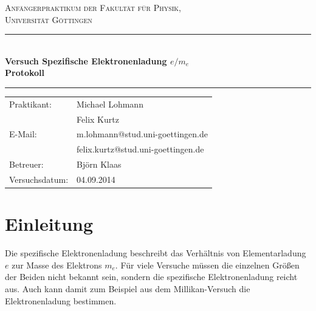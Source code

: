 \documentclass[12pt,a4paper,titlepage,headinclude,bibtotoc]{scrartcl}
\numberwithin{equation}{section}
\begin{document}
\newpage
\begin{titlepage}
\centering
\textsc{\Large Anfängerpraktikum der Fakultät für
  Physik,\\[1.5ex] Universität Göttingen}

\vspace*{3cm}

\rule{\textwidth}{1pt}\\[0.5cm]
{\huge \bfseries
  Versuch Spezifische Elektronenladung $e/m_e$\\[1.5ex]
  Protokoll}\\[0.5cm]
\rule{\textwidth}{1pt}

\vspace*{3cm}

\begin{Large}
\begin{tabular}{ll}
Praktikant: &  Michael Lohmann\\
 &  Felix Kurtz\\
 E-Mail: & m.lohmann@stud.uni-goettingen.de\\
 &  felix.kurtz@stud.uni-goettingen.de\\
 Betreuer: & Björn Klaas\\
 Versuchsdatum: & 04.09.2014\\
\end{tabular}
\end{Large}

\vspace*{0.8cm}

\begin{Large}
\end{Large}

\end{titlepage}

\tableofcontents

\newpage

\section{Einleitung}
\label{sec:einleitung}
Die spezifische Elektronenladung beschreibt das Verhältnis von Elementarladung $e$ zur Masse des Elektrons $m_e$.
Für viele Versuche müssen die einzelnen Größen der Beiden nicht bekannt sein, sondern die spezifische Elektronenladung reicht aus.
Auch kann damit zum Beispiel aus dem Millikan-Versuch die Elektronenladung bestimmen.
\end{document}
